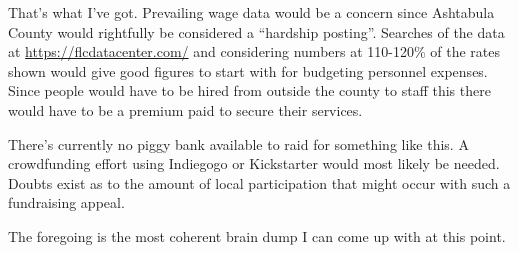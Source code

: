 That's what I've got. Prevailing wage data would be a concern since
Ashtabula County would rightfully be considered a ``hardship posting''.
Searches of the data at \url{https://flcdatacenter.com/} and considering
numbers at 110-120\% of the rates shown would give good figures to start
with for budgeting personnel expenses. Since people would have to be
hired from outside the county to staff this there would have to be a
premium paid to secure their services.

There's currently no piggy bank available to raid for something like
this. A crowdfunding effort using Indiegogo or Kickstarter would most
likely be needed. Doubts exist as to the amount of local participation
that might occur with such a fundraising appeal.

The foregoing is the most coherent brain dump I can come up with at this
point.
